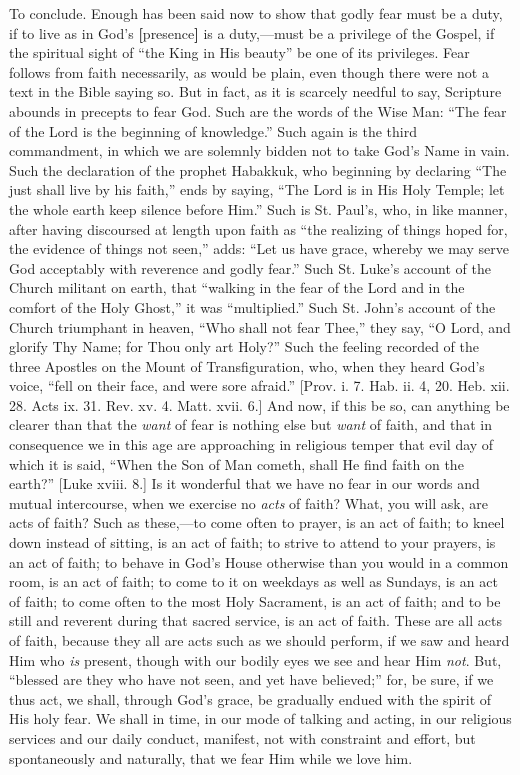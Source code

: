 To conclude. Enough has been said now to show that godly fear must
be a duty, if to live as in God's \textbf{[}presence\textbf{]}
is a duty,—must be a
privilege of the Gospel, if the spiritual sight of ``the King in
His beauty'' be one of its privileges. Fear follows from faith
necessarily, as would be plain, even though there were not a text in
the Bible saying so. But in fact, as it is scarcely needful to say,
Scripture abounds in precepts to fear God. Such are the words of the
Wise Man: ``The fear of the Lord is the beginning of
knowledge.'' Such again is the third commandment, in which we are
solemnly bidden not to take God's Name in vain. Such the declaration
of the prophet Habakkuk, who beginning by declaring ``The just
shall live by his faith,'' ends by saying, ``The Lord is in
His Holy Temple; let the whole earth keep silence before Him.''
Such is St. Paul's, who, in like manner, after having discoursed at
length upon faith as ``the realizing of things hoped for, the
evidence of things not seen,'' adds: ``Let us have grace,
whereby we may serve God acceptably with reverence and godly
fear.'' Such St. Luke's account of the Church militant on earth,
that ``walking in the fear of the Lord and in the comfort of the
Holy Ghost,'' it was ``multiplied.'' Such St. John's
account of the Church triumphant in heaven, ``Who shall not fear
Thee,'' they say, ``O Lord, and glorify Thy Name; for Thou
only art Holy?'' Such the feeling recorded of the three Apostles
on the Mount of Transfiguration, who, when they heard God's voice,
``fell on their face, and were sore afraid.'' [Prov. i. 7. Hab.
ii. 4, 20. Heb. xii. 28. Acts ix. 31. Rev. xv. 4. Matt. xvii. 6.] And
now, if this be so, can anything be clearer than that the \emph{want}
of fear is nothing else but \emph{want} of faith, and that in consequence we in this age are approaching in religious temper that
evil day of which it is said, ``When the Son of Man cometh, shall
He find faith on the earth?'' [Luke xviii. 8.] Is it wonderful
that we have no fear in our words and mutual intercourse, when we
exercise no \emph{acts} of faith? What, you will ask, are acts of
faith? Such as these,—to come often to prayer, is an act of faith;
to kneel down instead of sitting, is an act of faith; to strive to
attend to your prayers, is an act of faith; to behave in God's House
otherwise than you would in a common room, is an act of faith; to come
to it on weekdays as well as Sundays, is an act of faith; to come
often to the most Holy Sacrament, is an act of faith; and to be still
and reverent during that sacred service, is an act of faith. These are
all acts of faith, because they all are acts such as we should
perform, if we saw and heard Him who \emph{is} present, though with
our bodily eyes we see and hear Him \emph{not}. But, ``blessed are
they who have not seen, and yet have believed;'' for, be sure, if
we thus act, we shall, through God's grace, be gradually endued with
the spirit of His holy fear. We shall in time, in our mode of talking
and acting, in our religious services and our daily conduct, manifest,
not with constraint and effort, but spontaneously and naturally, that
we fear Him while we love him.

